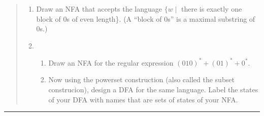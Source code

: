 \documentclass[11pt]{article}
\begin{document}



\begin{quote}
\begin{enumerate}
\item Draw an NFA that accepts the language $\{w \mid$ there is exactly one  block of $0$s of even length\}.  (A ``block of $0$s'' is a maximal substring of $0$s.)
\item 
\begin{enumerate}
\item Draw an NFA for the regular expression $(010)^* + (01)^* + 0^*.$
\item Now using the powerset construction (also called the subset construcion), design a DFA for the same language.  Label the states of your DFA with names that are sets of states of your NFA.
\end{enumerate}
\end{enumerate}
\end{quote}
\hrule
\end{document}

